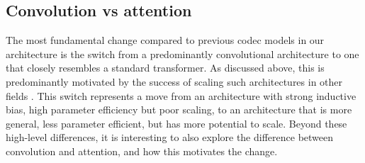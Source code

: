 \documentclass{article} %
\begin{document}
\vspace{1em}
\begin{table}[h]
\centering
\footnotesize
\renewcommand{\arraystretch}{1.2} %
\caption{Comparison of receptive field and streamability across different models. RF stands for the receptive field. Unlimited RF values do not take into account chunked inference.}
\label{tab:receptive_field_comparison}
\end{table}

\subsection{Convolution vs attention}
\label{app:conv_vs_att}
The most fundamental change compared to previous codec models in our architecture is the switch from a predominantly convolutional architecture to one that closely resembles a standard transformer. As discussed above, this is predominantly motivated by the success of scaling such architectures in other fields \citep{hoffmann2022, vit}. This switch represents a move from an architecture with strong inductive bias, high parameter efficiency but poor scaling, to an architecture that is more general, less parameter efficient, but has more potential to scale.
Beyond these high-level differences, it is interesting to also explore the difference between convolution and attention, and how this motivates the change.
\end{document}

